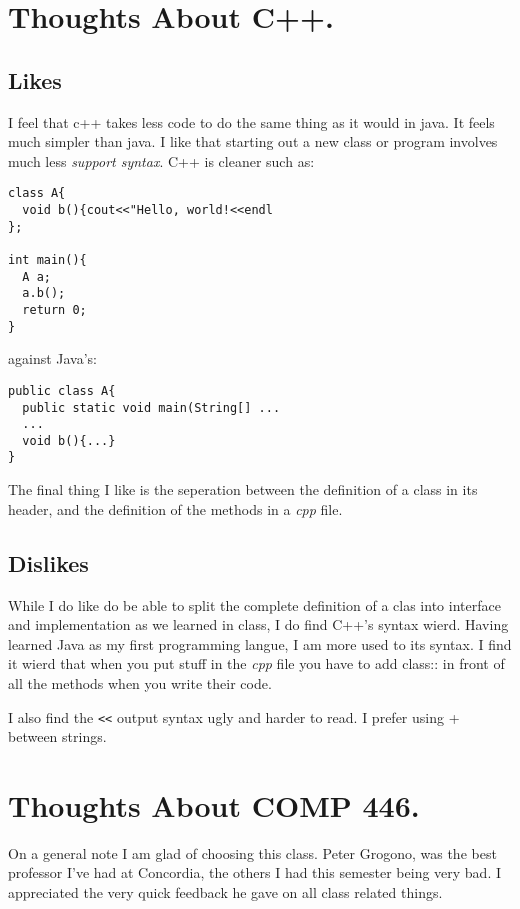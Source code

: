 \documentclass[12pt]{article}
\begin{document}
\section{Thoughts About C++.}
\subsection{Likes}
I feel that c++ takes less code to do the same thing as it would in java.  It feels much simpler than java.  I like that starting out a new class or program involves much less \emph{support syntax}. C++ is cleaner such as:

\begin{verbatim}
class A{
  void b(){cout<<"Hello, world!<<endl
};

int main(){
  A a;
  a.b();
  return 0;
}
\end{verbatim}

against Java's:

\begin{verbatim}
public class A{
  public static void main(String[] ...
  ...
  void b(){...}
}
\end{verbatim}

The final thing I like is the seperation between the definition of a class in its header, and the definition of the methods in a \emph{cpp} file.

\subsection{Dislikes}
While I do like do be able to split the complete definition of a clas into
interface and implementation as we learned in class, I do find C++'s syntax
wierd.  Having learned Java as my first programming langue, I am more used to
its syntax.  I find it wierd that when you put stuff in the \emph{cpp} file you
have to add class:: in front of all the methods when you write their code.


I also find the \verb|<<| output syntax ugly and harder to read.  I prefer 
using + between strings.

\section{Thoughts About COMP 446.}

On a general note I am glad of choosing this class.  Peter Grogono, was the
best professor I've had at Concordia, the others I had this semester being very
bad. I appreciated the very quick feedback he gave on all class related things.
\end{document}
